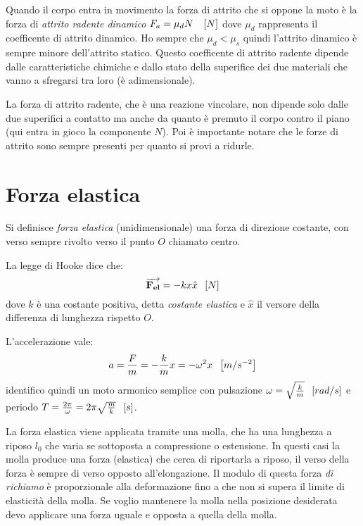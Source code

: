 \documentclass[class=book, crop=false, oneside, 12pt]{standalone}
\begin{document}
Quando il corpo entra in movimento la forza di attrito che si oppone la moto è la forza di \emph{attrito radente dinamico} \(F_a = \mu_d N \ \hspace{0.2cm} \left[N\right]\) dove \(\mu_d\) rappresenta il coefficente di attrito dinamico.
Ho sempre che \(\mu_d < \mu_s\) quindi l'attrito dinamico è sempre minore dell'attrito statico.
Questo coefficente di attrito radente dipende dalle caratteristiche chimiche e dallo stato della superifice dei due materiali che vanno a sfregarsi tra loro (è adimensionale).

La forza di attrito radente, che è una reazione vincolare, non dipende solo dalle due superifici a contatto ma anche da quanto è premuto il corpo contro il piano (qui entra in gioco la componente \(N\)).
Poi è importante notare che le forze di attrito sono sempre presenti per quanto si provi a ridurle.

\section{Forza elastica}

Si definisce \emph{forza elastica} (unidimensionale) una forza di direzione costante, con verso sempre rivolto verso il punto \(O\) chiamato centro.

La legge di Hooke dice che:
\begin{equation}
    \overrightarrow{\mathbf{F_{el}}} = -k x \hat{x} \udm{N}
\end{equation}
dove \(k\) è una costante positiva, detta \emph{costante elastica} e \(\hat{x}\) il versore della differenza di lunghezza rispetto \(O\).

L'accelerazione vale:
\begin{equation}
    a = \frac{F}{m} = -\frac{k}{m}x = -\omega^2 x \hspace{0.2cm} \left[m/s^{-2}\right]
\end{equation}
identifico quindi un moto armonico semplice con pulsazione \(\omega = \sqrt{\frac{k}{m}} \hspace{0.2cm} \left[rad/s\right]\)  e periodo \(T = \frac{2 \pi}{\omega} = 2 \pi \sqrt{\frac{m}{k}} \hspace{0.2cm} \left[s\right]\).

La forza elastica viene applicata tramite una molla, che ha una lunghezza a riposo \(l_0\) che varia se sottoposta a compressione o estensione. 
In questi casi la molla produce una forza (elastica) che cerca di riportarla a riposo, il verso della forza è sempre di verso opposto all'elongazione. 
Il modulo di questa forza \emph{di richiamo} è proporzionale alla deformazione fino a che non si supera il limite di elasticità della molla.
Se voglio mantenere la molla nella posizione desiderata devo applicare una forza uguale e opposta a quella della molla.
\end{document}
